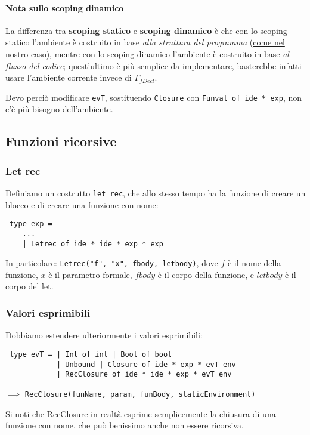 \documentclass[a4paper,10pt]{article}
\begin{document}
\paragraph{Nota sullo scoping dinamico} La differenza tra \textbf{scoping statico} e \textbf{scoping dinamico} è che con lo scoping statico l'ambiente è costruito in base \emph{alla struttura del programma} (\underline{come nel nostro caso}), mentre con lo scoping dinamico l'ambiente è costruito in base \emph{al flusso del codice}; quest'ultimo è più semplice da implementare, basterebbe infatti usare l'ambiente corrente invece di $\Gamma_{fDecl}$. \smallskip

Devo perciò modificare \texttt{evT}, sostituendo \texttt{Closure} con \texttt{Funval of ide * exp}, non c'è più bisogno dell'ambiente.

\subsection{Funzioni ricorsive}
\subsubsection{Let rec}
Definiamo un costrutto \texttt{let rec}, che allo stesso tempo ha la funzione di creare un blocco e di creare una funzione con nome:
\begin{lstlisting}
 type exp =
    ...
    | Letrec of ide * ide * exp * exp
\end{lstlisting}

In particolare: \texttt{Letrec("f", "x", fbody, letbody)}, dove $f$ è il nome della funzione, $x$ è il parametro formale, $fbody$ è il corpo della funzione, e $letbody$ è il corpo del let.

\subsubsection{Valori esprimibili}
Dobbiamo estendere ulteriormente i valori esprimibili:
\begin{lstlisting}
 type evT = | Int of int | Bool of bool
            | Unbound | Closure of ide * exp * evT env
            | RecClosure of ide * ide * exp * evT env
\end{lstlisting}
 $\implies$ \texttt{RecClosure(funName, param, funBody, staticEnvironment)}\smallskip

Si noti che RecClosure in realtà esprime semplicemente la chiusura di una funzione con nome, che può benissimo anche non essere ricorsiva.
\end{document}
